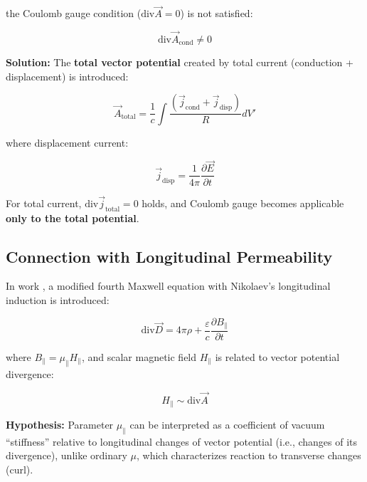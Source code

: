 \documentclass[12pt, a4paper]{article}
\begin{document}
the Coulomb gauge condition ($\text{div} \vec{A} = 0$) is not satisfied:

\begin{equation}
\text{div} \vec{A}_{\text{cond}} \neq 0
\label{eq:divergence_error}
\end{equation}

\textbf{Solution:} The \textbf{total vector potential} created by total current (conduction + displacement) is introduced:

\begin{equation}
\vec{A}_{\text{total}} = \frac{1}{c} \int \frac{(\vec{j}_{\text{cond}} + \vec{j}_{\text{disp}})}{R} dV'
\label{eq:vector_potential_total}
\end{equation}

where displacement current:

\begin{equation}
\vec{j}_{\text{disp}} = \frac{1}{4\pi} \frac{\partial \vec{E}}{\partial t}
\label{eq:displacement_current}
\end{equation}

For total current, $\text{div} \vec{j}_{\text{total}} = 0$ holds, and Coulomb gauge becomes applicable \textbf{only to the total potential}.

\subsection{Connection with Longitudinal Permeability}

In work \cite{NikolaevLorentz}, a modified fourth Maxwell equation with Nikolaev's longitudinal induction is introduced:

\begin{equation}
\text{div} \vec{D} = 4\pi\rho + \frac{\varepsilon}{c} \frac{\partial B_{\parallel}}{\partial t}
\label{eq:nikolaev_equation}
\end{equation}

where $B_{\parallel} = \mu_{\parallel} H_{\parallel}$, and scalar magnetic field $H_{\parallel}$ is related to vector potential divergence:

\begin{equation}
H_{\parallel} \sim \text{div} \vec{A}
\label{eq:longitudinal_h}
\end{equation}

\textbf{Hypothesis:} Parameter $\mu_{\parallel}$ can be interpreted as a coefficient of vacuum ``stiffness'' relative to longitudinal changes of vector potential (i.e., changes of its divergence), unlike ordinary $\mu$, which characterizes reaction to transverse changes (curl).
\end{document}
